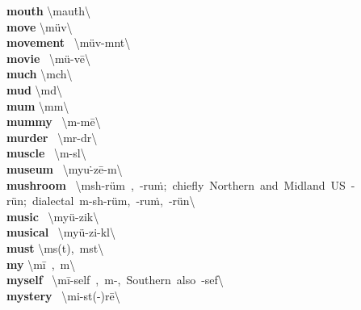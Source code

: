 \documentclass[10pt,a4paper]{article}
\begin{document}
\begin{multicols}{2}
\textbf{ mouth }\quad \textbackslash \textprimstress mau\. th\textbackslash \\
\textbf{ move }\quad \textbackslash \textprimstress m\"{u}v\textbackslash \\
\textbf{ movement }\quad \ \textbackslash \textprimstress m\"{u}v-m\textschwa nt\textbackslash \\
\textbf{ movie }\quad \ \textbackslash \textprimstress m\"{u}-v\={e}\textbackslash \\
\textbf{ much }\quad \textbackslash \textprimstress m\textschwa ch\textbackslash \\
\textbf{ mud }\quad \textbackslash \textprimstress m\textschwa d\textbackslash \\
\textbf{ mum }\quad \textbackslash \textprimstress m\textschwa m\textbackslash \\
\textbf{ mummy }\quad \ \textbackslash \textprimstress m\textschwa -m\={e}\textbackslash \\
\textbf{ murder }\quad \ \textbackslash \textprimstress m\textschwa r-d\textschwa r\textbackslash \\
\textbf{ muscle }\quad \ \textbackslash \textprimstress m\textschwa -s\textschwa l\textbackslash \\
\textbf{ museum }\quad \ \textbackslash myu\. -\textprimstress z\={e}-\textschwa m\textbackslash \\
\textbf{ mushroom }\quad \ \textbackslash \textprimstress m\textschwa sh-\textsecstress r\"{u}m\ ,\ -\textsecstress ru\. m;\ chiefly\ Northern\ and\ Midland\ US\ -\textsecstress r\"{u}n;\ dialectal\ \textprimstress m\textschwa -sh\textschwa -\textsecstress r\"{u}m,\ -\textsecstress ru\. m,\ -\textsecstress r\"{u}n\textbackslash \\
\textbf{ music }\quad \ \textbackslash \textprimstress my\"{u}-zik\textbackslash \\
\textbf{ musical }\quad \ \textbackslash \textprimstress my\"{u}-zi-k\textschwa l\textbackslash \\
\textbf{ must }\quad \textbackslash m\textschwa s(t),\ \textprimstress m\textschwa st\textbackslash \\
\textbf{ my }\quad \textbackslash \textprimstress m\={i}\ ,\ m\textschwa \textbackslash \\
\textbf{ myself }\quad \ \textbackslash m\={i}-\textprimstress self\ ,\ m\textschwa -,\ Southern\ also\ -\textprimstress sef\textbackslash \\
\textbf{ mystery }\quad \ \textbackslash \textprimstress mi-st(\textschwa -)r\={e}\textbackslash \\

\end{multicols}
\end{document}

